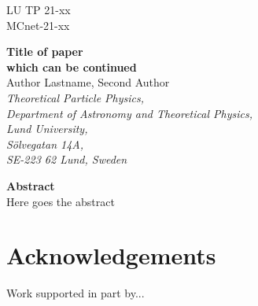 \documentclass[12pt,a4paper]{article}
\newlength{\abstwidth}
\begin{document}
\sloppy
 
\pagestyle{empty}
 
\begin{flushright}
LU TP 21-xx\\
MCnet-21-xx\\
\end{flushright}

\vspace{\fill}

\begin{center}
{\Huge\bf Title of paper}\\[4mm]
{\Huge\bf which can be continued}\\[10mm]
{\Large Author Lastname, Second Author} \\[3mm]
{\it Theoretical Particle Physics,}\\[1mm]
{\it Department of Astronomy and Theoretical Physics,}\\[1mm]
{\it Lund University,}\\[1mm]
{\it S\"olvegatan 14A,}\\[1mm]
{\it SE-223 62 Lund, Sweden}
\end{center}

\vspace{\fill}

\begin{center}
\begin{minipage}{\abstwidth}
{\bf Abstract}\\[2mm]
Here goes the abstract
\end{minipage}
\end{center}

\vspace{\fill}

\phantom{dummy}

\clearpage

\pagestyle{plain}
\setcounter{page}{1}





\cite{Bierlich:2020naj}
\section*{Acknowledgements}

Work supported in part by...






\end{document}
